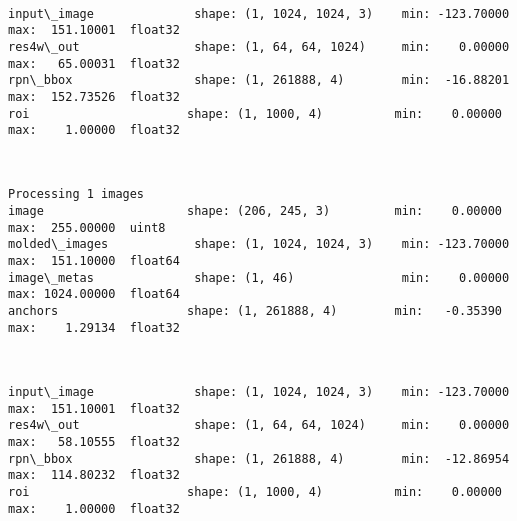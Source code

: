 \documentclass[11pt]{article}
\begin{document}
    \begin{center}
    \end{center}
    { \hspace*{\fill} \\}
    
    \begin{Verbatim}[commandchars=\\\{\}]
input\_image              shape: (1, 1024, 1024, 3)    min: -123.70000  max:  151.10001  float32
res4w\_out                shape: (1, 64, 64, 1024)     min:    0.00000  max:   65.00031  float32
rpn\_bbox                 shape: (1, 261888, 4)        min:  -16.88201  max:  152.73526  float32
roi                      shape: (1, 1000, 4)          min:    0.00000  max:    1.00000  float32

    \end{Verbatim}

    \begin{center}
    \end{center}
    { \hspace*{\fill} \\}
    
    \begin{Verbatim}[commandchars=\\\{\}]
Processing 1 images
image                    shape: (206, 245, 3)         min:    0.00000  max:  255.00000  uint8
molded\_images            shape: (1, 1024, 1024, 3)    min: -123.70000  max:  151.10000  float64
image\_metas              shape: (1, 46)               min:    0.00000  max: 1024.00000  float64
anchors                  shape: (1, 261888, 4)        min:   -0.35390  max:    1.29134  float32

    \end{Verbatim}

    \begin{center}
    \end{center}
    { \hspace*{\fill} \\}
    
    \begin{Verbatim}[commandchars=\\\{\}]
input\_image              shape: (1, 1024, 1024, 3)    min: -123.70000  max:  151.10001  float32
res4w\_out                shape: (1, 64, 64, 1024)     min:    0.00000  max:   58.10555  float32
rpn\_bbox                 shape: (1, 261888, 4)        min:  -12.86954  max:  114.80232  float32
roi                      shape: (1, 1000, 4)          min:    0.00000  max:    1.00000  float32

    \end{Verbatim}
\end{document}
